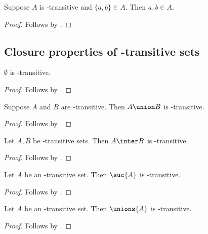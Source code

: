 \begin{proposition}\label{transitiveset_upair}
    Suppose $A$ is \in-transitive and $\{a,b\}\in A$.
    Then $a,b\in A$.
\end{proposition}
\begin{proof}
    Follows by .
\end{proof}

\subsection{Closure properties of \in-transitive sets}

\begin{proposition}\label{emptyset_transitiveset}
    $\emptyset$ is \in-transitive.
\end{proposition}
\begin{proof}
    Follows by .
\end{proof}

\begin{proposition}\label{union_of_transitiveset_is_transitiveset}
    Suppose $A$ and $B$ are \in-transitive.
    Then $A\union B$ is \in-transitive.
\end{proposition}
\begin{proof}
    Follows by .
\end{proof}

\begin{proposition}\label{inter_of_transitiveset_is_transitiveset}
    Let $A, B$ be \in-transitive sets.
    Then $A\inter B$ is \in-transitive.
\end{proposition}
\begin{proof}
    Follows by .
\end{proof}

\begin{proposition}\label{suc_of_transitiveset_is_transitiveset}
    Let $A$ be an \in-transitive set.
    Then $\suc{A}$ is \in-transitive.
\end{proposition}
\begin{proof}
    Follows by .
\end{proof}

\begin{proposition}\label{unions_of_transitiveset_is_transitiveset}
    Let $A$ be an \in-transitive set.
    Then $\unions{A}$ is \in-transitive.
\end{proposition}
\begin{proof}
    Follows by .
\end{proof}

